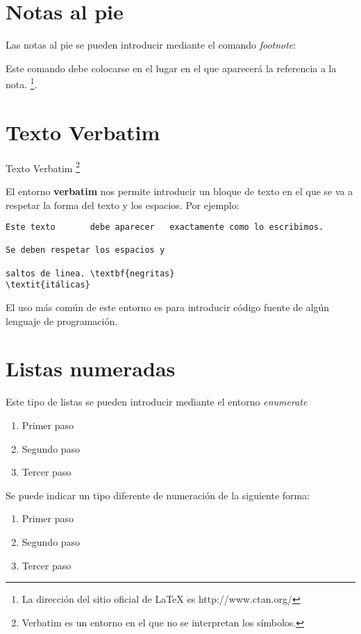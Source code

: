 \documentclass[letterpaper,12pt]{book}
\begin{document}
\chapter{Notas al pie}

Las notas al pie se pueden introducir mediante el comando \textit{footnote}:

Este comando debe colocarse en el lugar en el que aparecerá la referencia a la nota. \footnote{La dirección del sitio oficial de \LaTeX{} es http://www.ctan.org/}.

\chapter{Texto Verbatim}
Texto Verbatim \footnote{Verbatim es un entorno en el que no se interpretan los símbolos.}


El entorno \textbf{verbatim} nos permite introducir un bloque de texto en el que se va a respetar la forma del texto y los espacios. Por ejemplo:

\begin{verbatim}
Este texto       debe aparecer   exactamente como lo escribimos.

Se deben respetar los espacios y

saltos de linea. \textbf{negritas} 
\textit{itálicas}
\end{verbatim}

El uso más común de este entorno es para introducir código fuente de algún lenguaje de programación.

\chapter{Listas numeradas}
Este tipo de listas se pueden introducir mediante el entorno \textit{enumerate}

\begin{enumerate}
	\item Primer paso
	\item Segundo paso
	\item Tercer paso
\end{enumerate}


Se puede indicar un tipo diferente de numeración de la siguiente forma:

\begin{enumerate}[I]
	\item Primer paso
	\item Segundo paso
	\item Tercer paso
\end{enumerate}
\end{document}
